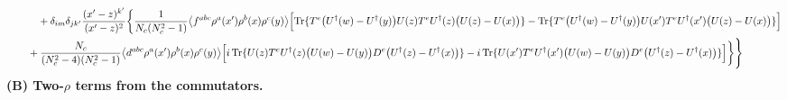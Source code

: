 \documentclass[10pt]{article}
\begin{document}
\begin{align}
&\qquad\quad+\delta_{im}\delta_{jk'}\frac{(x'-z)^{k'}}{(x'-z)^{2}}\bigg\{\frac{1}{N_{c}(N_{c}^{2}-1)}\big\langle f^{abc}\rho^{a}(x')\rho^{b}(x)\rho^{c}(y)\big\rangle\Big[{\rm Tr}\{T^{e}\big(U^{\dagger}(w)-U^{\dagger}(y)\big)U(z)T^{e}U^{\dagger}(z)\big(U(z)-U(x)\big)\}-{\rm Tr}\{T^{e}\big(U^{\dagger}(w)-U^{\dagger}(y)\big)U(x')T^{e}U^{\dagger}(x')\big(U(z)-U(x)\big)\}\Big]\notag\\&\qquad+\frac{N_{c}}{(N_{c}^{2}-4)(N_{c}^{2}-1)}\big\langle d^{abc}\rho^{a}(x')\rho^{b}(x)\rho^{c}(y)\big\rangle\Big[i\,{\rm Tr}\{U(z)T^{e}U^{\dagger}(z)\big(U(w)-U(y)\big)D^{e}\big(U^{\dagger}(z)-U^{\dagger}(x)\big)\}-i\,{\rm Tr}\{U(x')T^{e}U^{\dagger}(x')\big(U(w)-U(y)\big)D^{e}\big(U^{\dagger}(z)-U^{\dagger}(x)\big)\}\Big]\bigg\}\Bigg\}
\end{align}
\textbf{(B) Two-$\rho$ terms from the commutators.}
\end{document}
